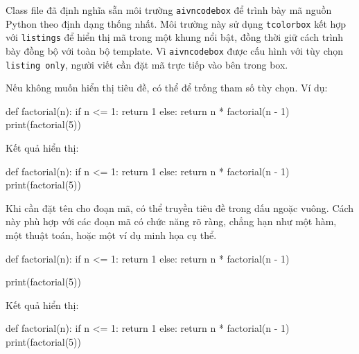 \documentclass[12pt]{ai_conquer2026}
\begin{document}
Class file đã định nghĩa sẵn môi trường \verb|aivncodebox| để trình bày mã nguồn Python theo định dạng thống nhất. Môi trường này sử dụng \verb|tcolorbox| kết hợp với \verb|listings| để hiển thị mã trong một khung nổi bật, đồng thời giữ cách trình bày đồng bộ với toàn bộ template. Vì \verb|aivncodebox| được cấu hình với tùy chọn \verb|listing only|, người viết cần đặt mã trực tiếp vào bên trong box.

Nếu không muốn hiển thị tiêu đề, có thể để trống tham số tùy chọn. Ví dụ:

\begin{aivnoutputbox}
\begin{aivncodebox}[]
\begin{python}
def factorial(n):
    if n <= 1:
        return 1
    else:
        return n * factorial(n - 1)
print(factorial(5))
\end{python}
\end{aivncodebox}
\end{aivnoutputbox}

Kết quả hiển thị:

\begin{aivncodebox}[]
\begin{python}
def factorial(n):
    if n <= 1:
        return 1
    else:
        return n * factorial(n - 1)
print(factorial(5))
\end{python}
\end{aivncodebox}

Khi cần đặt tên cho đoạn mã, có thể truyền tiêu đề trong dấu ngoặc vuông. Cách này phù hợp với các đoạn mã có chức năng rõ ràng, chẳng hạn như một hàm, một thuật toán, hoặc một ví dụ minh họa cụ thể.

\begin{aivnoutputbox}
\begin{aivncodebox}
\begin{python}
def factorial(n):
    if n <= 1:
        return 1
    else:
        return n * factorial(n - 1)

print(factorial(5))
\end{python}
\end{aivncodebox}
\end{aivnoutputbox}

\newpage
Kết quả hiển thị:

\begin{aivncodebox}
\begin{python}
def factorial(n):
    if n <= 1:
        return 1
    else:
        return n * factorial(n - 1)
print(factorial(5))
\end{python}
\end{aivncodebox}
\end{document}

